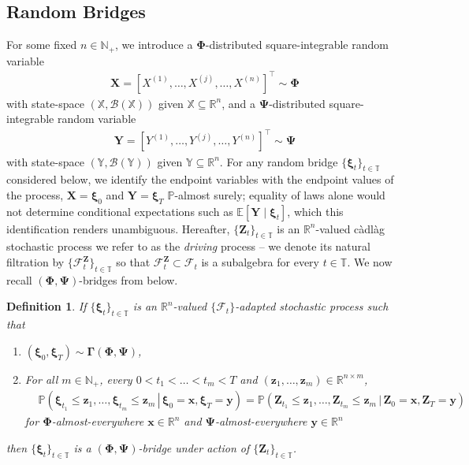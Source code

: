 \documentclass{article}
\newtheorem{defn}[thm]{Definition}
\def\R{\mathbb{R}}
\def\P{\mathbb{P}}
\def\E{\mathbb{E}}
\def\N{\mathbb{N}}
\def\T{\mathbb{T}}
\def\tp{\top}
\def\F{\mathcal{F}}
\def\xib{\boldsymbol{\xi}}
\theoremstyle{definition}
\begin{document}
\subsection{Random Bridges}
For some fixed $n\in\N_+$, we introduce a $\boldsymbol{\Phi}$-distributed square-integrable random variable
\begin{align}
\boldsymbol{X} = [X^{(1)}, \ldots,X^{(j)}, \ldots, X^{(n)}]^{\tp} \sim \boldsymbol{\Phi}
\end{align}
with state-space $(\mathbb{X},\mathcal{B}(\mathbb{X}))$ given $\mathbb{X} \subseteq \R^n$, and a $\boldsymbol{\Psi}$-distributed square-integrable random variable
\begin{align}
\boldsymbol{Y}= [Y^{(1)}, \ldots,Y^{(j)}, \ldots, Y^{(n)}]^{\tp} \sim \boldsymbol{\Psi}
\end{align}
with state-space $(\mathbb{Y},\mathcal{B}(\mathbb{Y}))$ given $\mathbb{Y} \subseteq \R^n$. For any random bridge $\{\xib_t\}_{t\in\T}$ considered below, we identify the endpoint variables with the endpoint values of the process, $\boldsymbol{X} = \xib_0$ and $\boldsymbol{Y} = \xib_T$ $\P$-almost surely; equality of laws alone would not determine conditional expectations such as $\E[\boldsymbol{Y} \mid \xib_t]$, which this identification renders unambiguous. Hereafter, $\{\boldsymbol{Z}_t\}_{t\in\T}$ is an $\R^n$-valued c\`adl\`ag stochastic process we refer to as the \emph{driving} process -- we denote its natural filtration by $\{\mathcal{F}_t^{\boldsymbol{Z}}\}_{t\in\T}$ so that $\mathcal{F}_t^{\boldsymbol{Z}} \subset \mathcal{F}_t$ is a subalgebra for every $t\in\T$. We now recall $(\boldsymbol{\Phi}, \boldsymbol{\Psi})$-bridges from \cite{goria_random-bridges_2025} below.
\begin{defn}
\label{definitionRandomBridge}
If $\{\xib_t\}_{t\in\T}$ is an $\R^n$-valued $\{\F_{t}\}$-adapted stochastic process such that
\begin{enumerate}
\item $(\xib_0,\xib_T) \sim \boldsymbol{\Gamma}(\boldsymbol{\Phi},\boldsymbol{\Psi})$,
\item For all $m\in\mathbb{N}_{+}$, every $0 < t_{1}<\ldots<t_{m}<T$ and $(\boldsymbol{z}_{1},\ldots,\boldsymbol{z}_{m})\in\R^{n\times m}$,
\begin{align}
&\mathbb{P}\left(\xib_{t_{1}}\leq \boldsymbol{z}_{1},\ldots, \xib_{t_{m}}\leq \boldsymbol{z}_{m} \, \left| \, \xib_0=\boldsymbol{x}, \xib_T=\boldsymbol{y}\right.\right)=
    \mathbb{P}\left(\boldsymbol{Z}_{t_{1}}\leq \boldsymbol{z}_{1},\ldots, \boldsymbol{Z}_{t_{m}}\leq \boldsymbol{z}_{m} \, \left| \, \boldsymbol{Z}_0=\boldsymbol{x}, \boldsymbol{Z}_T=\boldsymbol{y}\right.\right) \nonumber
\end{align}
for $\boldsymbol{\Phi}$-almost-everywhere $\boldsymbol{x}\in\R^n$ and $\boldsymbol{\Psi}$-almost-everywhere $\boldsymbol{y}\in\R^n$
\end{enumerate}
then $\{\xib_t\}_{t\in\T}$ is a $(\boldsymbol{\Phi}, \boldsymbol{\Psi})$-bridge under action of $\{\boldsymbol{Z}_t\}_{t\in\T}$.
\end{defn}
\end{document}
